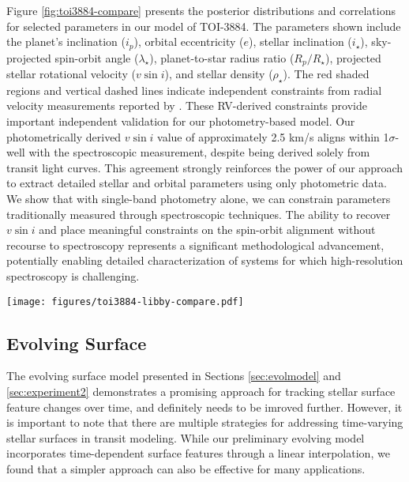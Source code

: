 \documentclass[twocolumn]{aastex631}
\begin{document}
Figure \ref{fig:toi3884-compare} presents the posterior distributions and correlations for selected parameters in our model of 
TOI-3884. The parameters shown include the planet's inclination ($i_p$), orbital eccentricity ($e$), 
stellar inclination ($i_\star$), sky-projected spin-orbit angle ($\lambda_\star$), planet-to-star radius ratio ($R_p/R_\star$), 
projected stellar rotational velocity ($v\sin i$), and stellar density ($\rho_\star$).
The red shaded regions and vertical dashed lines indicate independent constraints from radial velocity measurements reported by 
\cite{Libby-Roberts2023}. These RV-derived constraints provide important independent validation for our photometry-based model. 
Our photometrically derived $v\sin i$ value of approximately 2.5 km/s aligns within 1$\sigma$-well with the spectroscopic 
measurement, 
despite being derived solely from transit light curves. This agreement strongly reinforces the power of our approach to 
extract detailed stellar and orbital parameters using only photometric data.
We show that with single-band photometry alone, we can constrain parameters traditionally measured through spectroscopic techniques. 
The ability to recover $v\sin i$ and place meaningful constraints on the spin-orbit alignment without recourse to 
spectroscopy represents a significant methodological advancement, potentially enabling detailed characterization of 
systems for which high-resolution spectroscopy is challenging.

\begin{figure*}[hbt!]
    \centering
    \texttt{[image: figures/toi3884-libby-compare.pdf]}
    \caption{The corner plot for planet's inclination ($i_p$), orbital eccentricity ($e$), 
    stellar inclination ($i_\star$), sky-projected spin-orbit angle ($\lambda_\star$), planet-to-star radius ratio ($R_p/R_\star$), 
    projected stellar rotational velocity ($v\sin i$), and stellar density ($\rho_\star$). The red shaded regions and vertical dashed lines indicate independent constraints from radial velocity measurements reported by 
    \cite{Libby-Roberts2023}.}
    \label{fig:toi3884-compare}
\end{figure*}
%
\subsection{Evolving Surface}
The evolving surface model presented in Sections \ref{sec:evolmodel} and \ref{sec:experiment2} demonstrates a promising 
approach for tracking stellar surface feature changes over time, and definitely needs to be imroved further. 
However, it is important to note that there are multiple strategies for addressing time-varying stellar surfaces in transit 
modeling. While our preliminary evolving model incorporates time-dependent surface features through a linear interpolation, 
we found that a simpler approach can also be effective for many applications.
\end{document}
